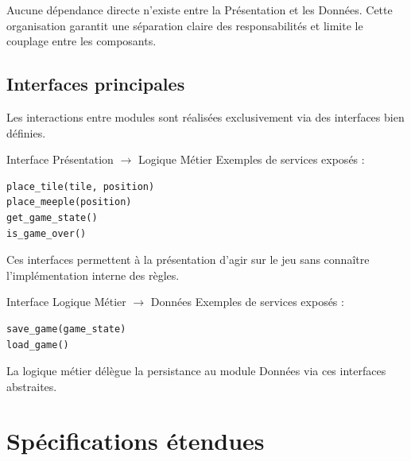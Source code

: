 \documentclass[a4paper]{article}
\begin{document}
Aucune dépendance directe n’existe entre la Présentation et les Données.
Cette organisation garantit une séparation claire des responsabilités et limite le couplage entre les composants.

\subsection{Interfaces principales}

Les interactions entre modules sont réalisées exclusivement via des interfaces bien définies.

Interface Présentation $\rightarrow$ Logique Métier
Exemples de services exposés :

{\normalsize
  \begin{verbatim}
place_tile(tile, position)
place_meeple(position)
get_game_state()
is_game_over()
  \end{verbatim}
}



Ces interfaces permettent à la présentation d’agir sur le jeu sans connaître l’implémentation interne des règles.

Interface Logique Métier $\rightarrow$ Données
Exemples de services exposés :

{\normalsize
  \begin{verbatim}
save_game(game_state)
load_game()
  \end{verbatim}
}




La logique métier délègue la persistance au module Données via ces interfaces abstraites.



\section{Spécifications étendues}

\newpage

\nocite{*}


\end{document}
